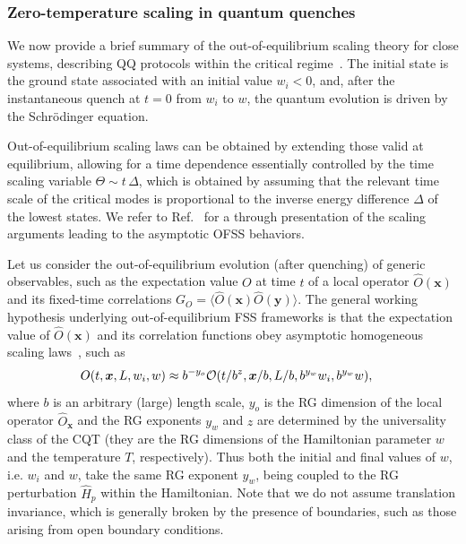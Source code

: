 \subsubsection{Zero-temperature scaling in quantum quenches}
\label{zeroT}

We now provide a brief summary of the out-of-equilibrium scaling
theory for close systems, describing QQ protocols within the critical
regime~\cite{PRV-18,RV-21}. The initial state is the ground state
associated with an initial value $w_i<0$, and, after the instantaneous
quench at $t=0$ from $w_i$ to $w$, the quantum evolution is driven by
the Schr\"odinger equation.

Out-of-equilibrium scaling laws can be obtained by extending those
valid at equilibrium, allowing for a time dependence essentially
controlled by the time scaling variable $\Theta \sim t\,\Delta$, which
is obtained by assuming that the relevant time scale of the critical
modes is proportional to the inverse energy difference $\Delta$ of the
lowest states. We refer to Ref.~\cite{RV-21} for a through
presentation of the scaling arguments leading to the asymptotic OFSS
behaviors.

Let us consider the out-of-equilibrium evolution (after quenching) of
generic observables, such as the expectation value $O$ at time $t$ of
a local operator $\hat{O}({\bm x})$ and its fixed-time correlations
$G_O=\langle \hat{O}({\bm x}) \hat{O}({\bm y})\rangle$. The general
working hypothesis underlying out-of-equilibrium FSS frameworks is
that the expectation value of $\hat{O}({\bm x})$ and its correlation
functions obey asymptotic homogeneous scaling laws~\cite{RV-21}, such
as
\begin{eqnarray}
O(t, {\bm x}, L, w_i, w) \approx  b^{-y_o} {\cal O}(t/b^z,
{\bm x}/b, L/b, b^{y_w} w_i, b^{y_w} w),\quad
    \label{Oscaquefss0}
\end{eqnarray}
  where $b$ is an arbitrary (large) length scale, $y_o$ is the RG
  dimension of the local operator $\hat{O}_{\bm x}$ and the RG
  exponents $y_w$ and $z$ are determined by the universality class of
  the CQT (they are the RG dimensions of the Hamiltonian parameter $w$
  and the temperature $T$, respectively). Thus both the initial and
  final values of $w$, i.e.  $w_i$ and $w$, take the same RG exponent
  $y_w$, being coupled to the RG perturbation ${\hat H}_p$ within the
  Hamiltonian. Note that we do not assume translation invariance,
  which is generally broken by the presence of boundaries, such as
  those arising from open boundary conditions.
  
